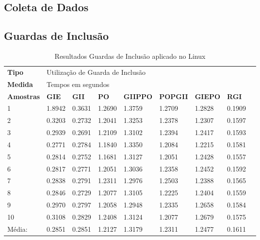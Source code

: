 \begin{apendicesenv}
\chapter{Coleta de Dados}
\label{coleta_de_dados_apendice}

\section{Guardas de Inclusão}
\label{guardas_de_inclusao_apendice}

\begin{table}[!ht]
\centering
\caption{Resultados Guardas de Inclusão aplicado no Linux}
\label{tab:resutados_guards_de_inclusao:linux}
\begin{tiny}
\begin{tabular}{lp{1cm}p{1cm}p{1cm}p{1cm}p{1cm}p{1cm}p{1cm}p{1cm}}
\textbf{Tipo} & \multicolumn{7}{l}{Utilização de Guarda de Inclusão} \\
\textbf{Medida} & \multicolumn{7}{l}{Tempos em segundos } \\
\textbf{Amostras} & \textbf{GIE} & \textbf{GII} & \textbf{PO} & 
\textbf{GIIPPO} & \textbf{POPGII} & \textbf{GIEPO} & \textbf{RGI} \\ \toprule
 1      & 1.8942     & 0.3631  & 1.2690    & 1.3759    & 1.2709  & 1.2828     & 0.1909 \\
 2      & 0.3203     & 0.2732  & 1.2041    & 1.3253    & 1.2378  & 1.2307     & 0.1597 \\
 3      & 0.2939     & 0.2691  & 1.2109    & 1.3102    & 1.2394  & 1.2417     & 0.1593 \\
 4      & 0.2771     & 0.2784  & 1.1840    & 1.3350    & 1.2084  & 1.2215     & 0.1581 \\
 5      & 0.2814     & 0.2752  & 1.1681    & 1.3127    & 1.2051  & 1.2428     & 0.1557 \\
 6      & 0.2817     & 0.2771  & 1.2051    & 1.3036    & 1.2358  & 1.2452     & 0.1592 \\
 7      & 0.2838     & 0.2791  & 1.2311    & 1.2976    & 1.2503  & 1.2388     & 0.1565 \\
 8      & 0.2846     & 0.2729  & 1.2077    & 1.3105    & 1.2225  & 1.2404     & 0.1559 \\
 9      & 0.2970     & 0.2797  & 1.2058    & 1.2948    & 1.2335  & 1.2658     & 0.1584  \\
 10     & 0.3108     & 0.2829  & 1.2408    & 1.3124    & 1.2077  & 1.2679     & 0.1575  \\ \bottomrule
 Média: & 0.2851     & 0.2851  & 1.2127    & 1.3179    & 1.2311  & 1.2477     & 0.1611 \\
\end{tabular}
\end{tiny}
\end{table}


\end{apendicesenv}

